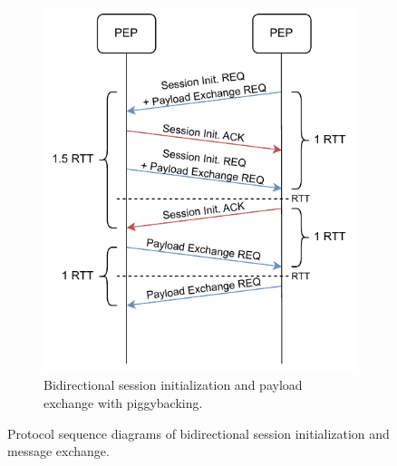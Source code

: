 \begin{description}
\begin{figure}
\begin{subfigure}[t]{0.48\linewidth}
            \includegraphics[width=\linewidth]{figures/SABAAC_protocols_accesscontrol_initialization_rtt_piggyback.drawio.pdf}
            \caption{Bidirectional session initialization and payload exchange with piggybacking.}
            \label{fig:sabaac_accesscontrol_initialization_rtt_piggyback}
        \end{subfigure}
        \caption{Protocol sequence diagrams of bidirectional session initialization and message exchange.
        }
        \label{fig:sabaac_accesscontrol_initialization_rtt}
    \end{figure}
\end{description}

